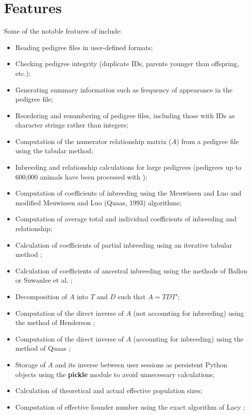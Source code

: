 \section{Features}
Some of the notable features of \PyPedal{} include:
\begin{itemize}
\item Reading pedigree files in user-defined formats;
\item Checking pedigree integrity (duplicate IDs, parents younger than offspring, etc.);
\item Generating summary information such as frequency of appearance in the pedigree file;
\item Reordering and renumbering of pedigree files, including those with IDs as character strings rather than integers;
\item Computation of the numerator relationship matrix ($A$) from a pedigree file using the tabular method;
\item Inbreeding and relationship calculations for large pedigrees (pedigrees up to 600,000 animals have been processed with \PyPedal{});
\item Computation of coefficients of inbreeding using the Meuwissen and Luo \cite{ref585} and modified Meuwissen and Luo (Quaas, 1993) algorithms;
\item Computation of average total and individual coefficients of inbreeding and relationship;
\item Calculation of coefficients of partial inbreeding using an iterative tabular method \cite{LacyAW1996,GulisijaGWT2006};
\item Calculation of coefficients of ancestral inbreeding using the methods of Ballou \citeyear{Ballou1997} or Suwanlee et al. \citeyear{SuwanleeBSC2007};
\item Decomposition of $A$ into $T$ and $D$ such that $A=TDT'$;
\item Computation of the direct inverse of $A$ (not accounting for inbreeding) using the method of Henderson \citeyear{ref143};
\item Computation of the direct inverse of $A$ (accounting for inbreeding) using the method of Quaas \citeyear{ref235};
\item Storage of $A$ and its inverse between user sessions as persistent Python objects using the \textbf{pickle} module to avoid unnecessary calculations;
\item Calculation of theoretical and actual effective population sizes;
\item Computation of effective founder number using the exact algorithm of Lacy \citeyear{ref640};

\end{itemize}
